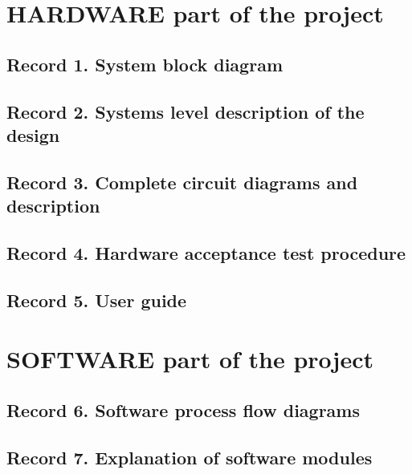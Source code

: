 
\section{HARDWARE part of the project}

\subsection{Record 1. System block diagram}


\subsection{Record 2.  Systems level description of the design}


\subsection{Record 3. Complete circuit diagrams and description}


\subsection{Record 4. Hardware acceptance test procedure}


\subsection{Record 5. User guide}



\section{SOFTWARE part of the project}

\subsection{Record 6. Software process flow diagrams}


\subsection{Record 7. Explanation of software modules}


